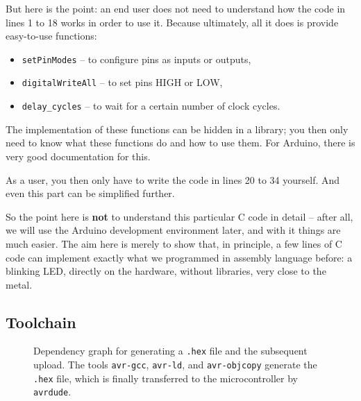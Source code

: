 \documentclass[a4paper,12pt]{article}
\begin{document}
But here is the point: an end user does not need to understand how the code
in lines 1 to 18 works in order to use it. Because ultimately, all it does is
provide easy-to-use functions:
\begin{itemize}
  \item
      \texttt{setPinModes} – to configure pins as inputs or outputs,
  \item
      \texttt{digitalWriteAll} – to set pins HIGH or LOW,
  \item
      \texttt{delay\_cycles} – to wait for a certain number of clock cycles.
\end{itemize}

\noindent
The implementation of these functions can be hidden in a library; you then
only need to know what these functions do and how to use them. For Arduino,
there is very good documentation for this.

As a user, you then only have to write the code in lines 20 to 34 yourself.
And even this part can be simplified further.

So the point here is \textbf{not} to understand this particular C code in
detail – after all, we will use the Arduino development environment later,
and with it things are much easier.
The aim here is merely to show that, in principle, a few lines of C code can
implement exactly what we programmed in assembly language before:
a blinking LED, directly on the hardware, without libraries, very close to
the metal.



\vspace{29bp}
\subsection{Toolchain}
\begin{figure}[ht]
\centering
{}
\caption{
    Dependency graph for generating a \texttt{.hex} file and the subsequent
    upload. The tools \texttt{avr-gcc}, \texttt{avr-ld}, and
    \texttt{avr-objcopy} generate the \texttt{.hex} file, which is finally
    transferred to the microcontroller by \texttt{avrdude}.
}
\label{fig:makegraph_c}
\end{figure}
\end{document}
